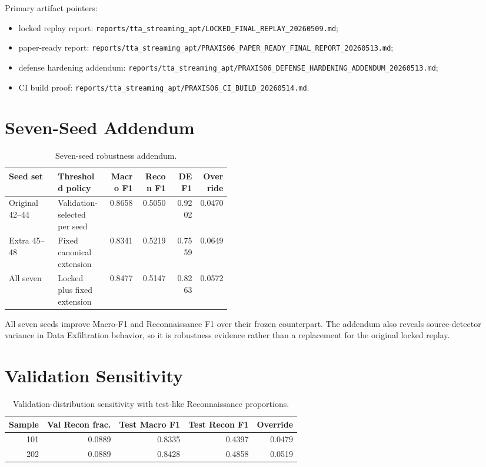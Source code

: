 \documentclass[10pt]{article}
\begin{document}
Primary artifact pointers:
\begin{itemize}[leftmargin=*]
  \item locked replay report: \texttt{reports/tta\_streaming\_apt/LOCKED\_FINAL\_REPLAY\_20260509.md};
  \item paper-ready report: \texttt{reports/tta\_streaming\_apt/PRAXIS06\_PAPER\_READY\_FINAL\_REPORT\_20260513.md};
  \item defense hardening addendum: \texttt{reports/tta\_streaming\_apt/PRAXIS06\_DEFENSE\_HARDENING\_ADDENDUM\_20260513.md};
  \item CI build proof: \texttt{reports/tta\_streaming\_apt/PRAXIS06\_CI\_BUILD\_20260514.md}.
\end{itemize}

\section{Seven-Seed Addendum}

\begin{table}[htbp]
  \centering
  \caption{Seven-seed robustness addendum.}
  \label{tab:seven-seed}
  \small
  \setlength{\tabcolsep}{4pt}
  \begin{tabular}{p{0.22\linewidth}p{0.22\linewidth}rrrr}
    \toprule
    Seed set & Threshold policy & Macro F1 & Recon F1 & DE F1 & Override \\
    \midrule
    Original 42--44 & Validation-selected per seed & 0.8658 & 0.5050 & 0.9202 & 0.0470 \\
    Extra 45--48 & Fixed canonical extension & 0.8341 & 0.5219 & 0.7559 & 0.0649 \\
    All seven & Locked plus fixed extension & 0.8477 & 0.5147 & 0.8263 & 0.0572 \\
    \bottomrule
  \end{tabular}
\end{table}

All seven seeds improve Macro-F1 and Reconnaissance F1 over their frozen counterpart.
The addendum also reveals source-detector variance in Data Exfiltration behavior, so it is robustness evidence rather than a replacement for the original locked replay.

\section{Validation Sensitivity}

\begin{table}[htbp]
  \centering
  \caption{Validation-distribution sensitivity with test-like Reconnaissance proportions.}
  \label{tab:val-sensitivity}
  \small
  \setlength{\tabcolsep}{5pt}
  \begin{tabular}{rrrrr}
    \toprule
    Sample & Val Recon frac. & Test Macro F1 & Test Recon F1 & Override \\
    \midrule
    101 & 0.0889 & 0.8335 & 0.4397 & 0.0479 \\
    202 & 0.0889 & 0.8428 & 0.4858 & 0.0519 \\
    \bottomrule
  \end{tabular}
\end{table}
\end{document}
